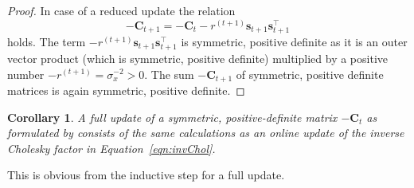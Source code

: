 \documentclass[11pt,a4paper,twoside,BCOR=15mm]{scrbook}
\newtheorem{theorem}{Theorem}
\newtheorem{corollary}{Corollary}
\newcommand{\vc}[1]{\bm{#1}}
\newcommand{\mat}[1]{\bm{#1}}
\newcommand{\Tr}{^{\top}}
\newcommand{\e}{\mathrm{e}}
\newcommand{\ped}[1]{_{\mathrm{#1}}}
\begin{document}
\begin{proof}
    In case of a reduced update the relation
    \begin{equation*}
        -\mat C_{t+1} = -\mat C_t - r^{(t+1)} \vc s_{t+1} \vc s_{t+1}\Tr
    \end{equation*}
    holds. The term $- r^{(t+1)} \vc s_{t+1} \vc s_{t+1}\Tr$ is symmetric, 
    positive definite as it is an outer vector product (which is symmetric, 
    positive definite) multiplied by a positive number $-r^{(t+1)} 
    = \sigma_x^{-2} > 0$. The sum $-\mat C_{t+1}$ of symmetric, positive 
    definite matrices is again symmetric, positive definite.
\end{proof}

\begin{corollary}
    A full update of a symmetric, positive-definite matrix $-\mat{C}_t$ as 
    formulated by \textcite[equation~2.9]{Csato:2002fp} consists of the same 
    calculations as an online update of the inverse Cholesky factor in 
    Equation~\ref{eqn:invChol}.
\end{corollary}
This is obvious from the inductive step for a full update.




\end{document}
